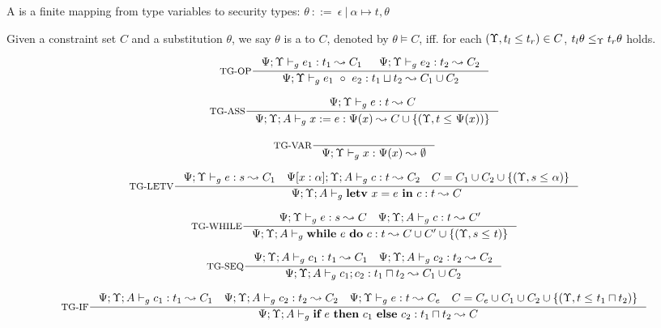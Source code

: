 {{{A  is a finite mapping from type variables to security types:
$
\theta ~::=~ \epsilon~|~\alpha \mapsto t,\theta
$


\begin{definition}
Given a constraint set $C$ and a substitution $\theta$, we say $\theta$ is a  to $C$, denoted by $\theta \vDash C $, iff. for each $(\Upsilon, t_l \leq t_r) \in C$, $t_l\theta \leq_{\Upsilon} t_r\theta $ holds.
\end{definition}

\begin{figure*}[ht]
\begin{scriptsize}
\[
\inference[TG-OP]
{\Psi;\trace \vdash_{g} e_1: t_1 \leadsto C_1 &
 \Psi;\trace \vdash_{g} e_2: t_2 \leadsto C_2}
{\Psi;\trace \vdash_{g} \leOP{e_1}{e_2} : t_1\sqcup t_2\leadsto C_1\cup C_2}
\]

\[
\inference[TG-ASS]
{\Psi;\trace \vdash_{g} e : t \leadsto C }
{\Psi;\trace; A \vdash_{g} \lcASS{x}{e} : \Psi(x)\leadsto C\cup \{ (\trace, t \leq_{} \Psi(x))\} }
\]



\[
\inference[TG-VAR]
{}
{\Psi;\trace \vdash_{g} \leVAR{x} : \Psi(x)\leadsto \emptyset}
\]

\[
\inference[TG-LETV]
{\Psi;\trace \vdash_{g} e : s \leadsto C_1 \quad
\Psi[x:\alpha]; \trace; A \vdash_{g} c : t \leadsto C_2 \quad
C = C_1\cup C_2 \cup \{(\trace, s \leq_{} \alpha) \}
}
{\Psi;\trace; A\vdash_{g} \lcLETV{x}{e}{c} :  t\leadsto C}
\]


\[
\inference[TG-WHILE]
{
\Psi;\trace \vdash_{g} e : s  \leadsto C \quad
\Psi;\trace; A \vdash_{g} c : t \leadsto C'
}
{\Psi;\trace;  A \vdash_{g} \lcWHILE{e}{c} : t  \leadsto C\cup C' \cup\{(\trace,s\leq_{} t)\}}
\]

\[
\inference[TG-SEQ]
{
\Psi;\trace; A \vdash_{g} c_1 : t_1  \leadsto C_1 \quad
\Psi;\trace; A \vdash_{g} c_2 : t_2 \leadsto C_2
}
{\Psi;\trace; A \vdash_{g} \lcSEQ{c_1}{c_2} : t_1\sqcap t_2 \leadsto C_1\cup C_2}
\]

\[
\inference[TG-IF]
{
\Psi;\trace; A \vdash_{g} c_1 : t_1 \leadsto C_1 \quad
\Psi;\trace; A \vdash_{g} c_2 : t_2 \leadsto C_2 \quad
\Psi;\trace \vdash_{g} e : t \leadsto C_e \quad
C = C_e\cup C_1\cup C_2 \cup \{(\trace, t \leq_{} t_1\sqcap t_2) \}}
{\Psi;\trace;  A \vdash_{g} \lcIF{e}{c_1}{c_2} : t_1\sqcap t_2 \leadsto C}
\]


\end{scriptsize}
\end{figure*}}}}
